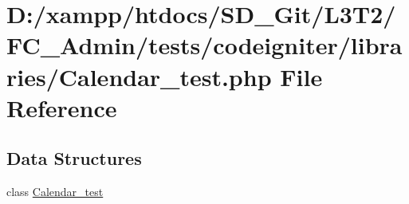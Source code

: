\hypertarget{_admin_2tests_2codeigniter_2libraries_2_calendar__test_8php}{}\section{D\+:/xampp/htdocs/\+S\+D\+\_\+\+Git/\+L3\+T2/\+F\+C\+\_\+\+Admin/tests/codeigniter/libraries/\+Calendar\+\_\+test.php File Reference}
\label{_admin_2tests_2codeigniter_2libraries_2_calendar__test_8php}
\subsection*{Data Structures}
\begin{DoxyCompactItemize}
\item 
class \hyperlink{class_calendar__test}{Calendar\+\_\+test}
\end{DoxyCompactItemize}

